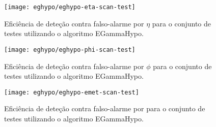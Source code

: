 \begin{figure}
\begin{center}
\texttt{[image: eghypo/eghypo-eta-scan-test]}
\end{center}
\caption{Eficiência de deteção contra falso-alarme por $\eta$ para o conjunto
de testes utilizando o algoritmo EGammaHypo.}
\label{fig:eghypo-eta-scan-test}
\end{figure}

\begin{figure}
\begin{center}
\texttt{[image: eghypo/eghypo-phi-scan-test]}
\end{center}
\caption{Eficiência de deteção contra falso-alarme por $\phi$ para o conjunto
de testes utilizando o algoritmo EGammaHypo.} 
\label{fig:eghypo-phi-scan-test}
\end{figure}

\begin{figure}
\begin{center}
\texttt{[image: eghypo/eghypo-emet-scan-test]}
\end{center}
\caption{Eficiência de deteção contra falso-alarme por \etem para o conjunto
de testes utilizando o algoritmo EGammaHypo.}
\label{fig:eghypo-emet-scan-test}
\end{figure}






